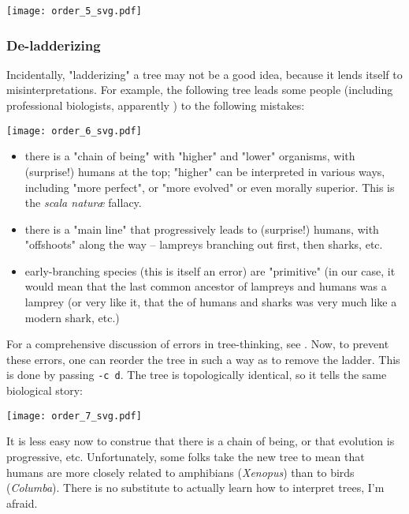 
\begin{center}
\texttt{[image: order\_5\_svg.pdf]}
\end{center}

\subsubsection{De-ladderizing}

Incidentally, "ladderizing" a tree may not be a good idea, because it lends
itself to misinterpretations. For example, the following tree leads some people
(including professional biologists, apparently \cite{Baum_2005}) to the
following mistakes:

\begin{center}
\texttt{[image: order\_6\_svg.pdf]}
\end{center}
\begin{itemize}
	\item there is a "chain of being" with "higher" and "lower" organisms, with (surprise!) humans at the top; "higher" can be interpreted in various ways, including "more perfect", or "more evolved" or even morally superior. This is the \textit{scala natur\ae} fallacy.
	\item there is a "main line" that progressively leads to (surprise!) humans, with "offshoots" along the way -- lampreys branching out first, then sharks, etc. 
	\item early-branching species (this is itself an error) are "primitive" (in our case, it would mean that the last common ancestor of lampreys and humans was a lamprey (or very like it, that the \lca{} of humans and sharks was very much like a modern shark, etc.)
\end{itemize}
For a comprehensive discussion of errors in tree-thinking, see
\cite{Gregory_2008}.  Now, to prevent these errors, one can reorder the tree in
such a way as to remove the ladder. This is done by passing \texttt{-c d}. The
tree is topologically identical, so it tells the same biological story:


\begin{center}
\texttt{[image: order\_7\_svg.pdf]}
\end{center}

\noindent{}It is less easy now to construe that there is a chain of being, or
that evolution is progressive, etc. Unfortunately, some folks take the new tree
to mean that humans are more closely related to amphibians (\textit{Xenopus})
than to birds (\textit{Columba}). There is no substitute to actually learn how
to interpret trees, I'm afraid. 

